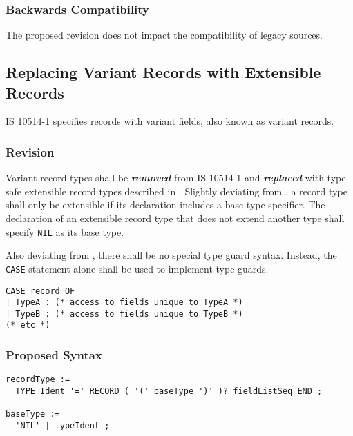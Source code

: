 \documentclass[10pt,a4paper,leqno,fleqn]{article}
\renewcommand{\emph}[1]{\textbf{\textit{#1}}}
\begin{document}
\subsubsection{Backwards Compatibility}

The proposed revision does not impact the compatibility of legacy sources.


\subsection{Replacing Variant Records with Extensible Records}

IS 10514-1 specifies records with variant fields, also known as variant records.

\subsubsection{Revision}

Variant record types shall be \emph{removed} from IS 10514-1 and
\emph{replaced} with type safe extensible record types described in \cite{Wirth90}.
Slightly deviating from \cite{Wirth90}, a record type shall only be extensible if its
declaration includes a base type specifier. The declaration of an extensible record
type that does not extend another type shall specify \verb|NIL| as its base type.

Also deviating from \cite{Wirth90}, there shall be no special type guard syntax.
Instead, the \verb|CASE| statement alone shall be used to implement type guards.

\lstset{style=modula2}
\begin{lstlisting}
CASE record OF
| TypeA : (* access to fields unique to TypeA *)
| TypeB : (* access to fields unique to TypeB *)
(* etc *)
\end{lstlisting}

\subsubsection{Proposed Syntax}

\begin{verbatim}
recordType :=
  TYPE Ident '=' RECORD ( '(' baseType ')' )? fieldListSeq END ;
  
baseType :=
  'NIL' | typeIdent ;
\end{verbatim}
\end{document}
